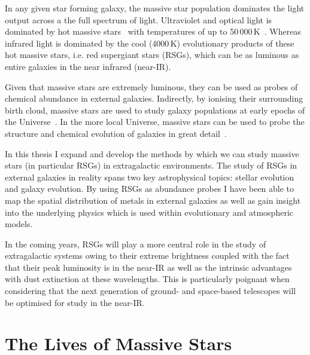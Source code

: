 In any given star forming galaxy, the massive star population dominates the light output across a the full spectrum of light.
Ultraviolet and optical light is dominated by hot massive stars~\citep{1998ARA&A..36..189K,2012ARA&A..50..531K} with temperatures of up to 50\,000\,K~\citep[e.g.][]{2011A&A...530L..14B}.
Whereas infrared light is dominated by the cool (4000\,K) evolutionary products of these hot massive stars, i.e. red supergiant stars (RSGs), which can be as luminous as entire galaxies in the near infrared (near-IR).

Given that massive stars are extremely luminous, they can be used as probes of chemical abundance in external galaxies.
Indirectly, by ionising their surrounding birth cloud, massive stars are used to study galaxy populations at early epochs of the Universe~\citep{2004MNRAS.348L..59P}.
In the more local Universe, massive stars can be used to probe the structure and chemical evolution of galaxies in great detail~\citep{2007ApJ...659.1198E,2008ApJ...681..269K,2008MNRAS.386..826E,2010AN....331..459K,2011A&A...530A.108E,2012A&A...542A..79C}.

In this thesis I expand and develop the methods by which we can study massive stars (in particular RSGs) in extragalactic environments.
The study of RSGs in external galaxies in reality spans two key astrophysical topics: stellar evolution and galaxy evolution.
By using RSGs as abundance probes I have been able to map the spatial distribution of metals in external galaxies as well as gain insight into the underlying physics which is used within evolutionary and atmospheric models.

In the coming years, RSGs will play a more central role in the study of extragalactic systems owing to their extreme brightness coupled with the fact that their peak luminosity is in the near-IR as well as the intrinsic advantages with dust extinction at these wavelengths.
This is particularly poignant when considering that the next generation of ground- and space-based telescopes will be optimised for study in the near-IR.


\section{The Lives of Massive Stars} %
\label{sec:lives}

